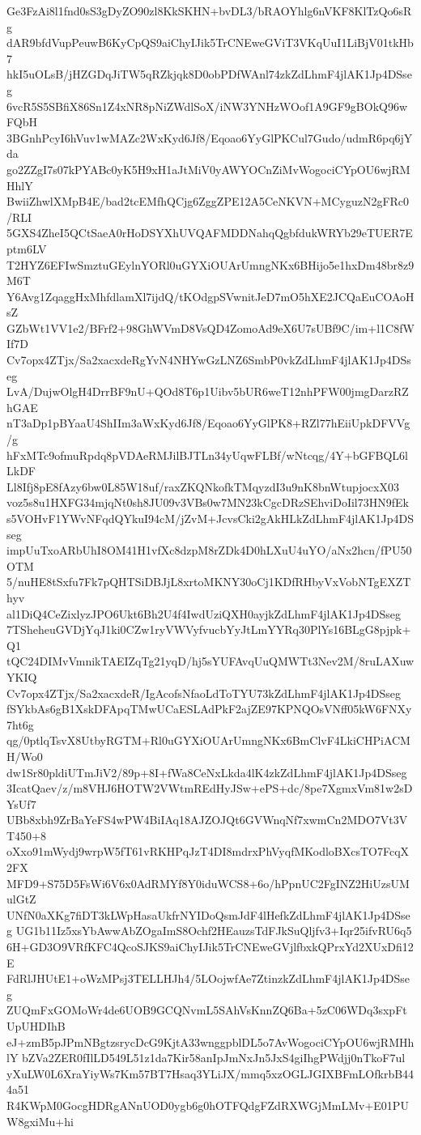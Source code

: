 Ge3FzAi8l1fnd0sS3gDyZO90zl8KkSKHN+bvDL3/bRAOYhlg6nVKF8KlTzQo6sRg
dAR9bfdVupPeuwB6KyCpQS9aiChyIJik5TrCNEweGViT3VKqUuI1LiBjV01tkHb7
hkI5uOLsB/jHZGDqJiTW5qRZkjqk8D0obPDfWAnl74zkZdLhmF4jlAK1Jp4DSseg
6vcR5S5SBfiX86Sn1Z4xNR8pNiZWdlSoX/iNW3YNHzWOof1A9GF9gBOkQ96wFQbH
3BGnhPcyI6hVuv1wMAZc2WxKyd6Jf8/Eqoao6YyGlPKCul7Gudo/udmR6pq6jYda
go2ZZgI7s07kPYABc0yK5H9xH1aJtMiV0yAWYOCnZiMvWogociCYpOU6wjRMHhlY
BwiiZhwlXMpB4E/bad2tcEMfhQCjg6ZggZPE12A5CeNKVN+MCyguzN2gFRc0/RLI
5GXS4ZheI5QCtSaeA0rHoDSYXhUVQAFMDDNahqQgbfdukWRYb29eTUER7Eptm6LV
T2HYZ6EFIwSmztuGEylnYORl0uGYXiOUArUmngNKx6BHijo5e1hxDm48br8z9M6T
Y6Avg1ZqaggHxMhfdlamXl7ijdQ/tKOdgpSVwnitJeD7mO5hXE2JCQaEuCOAoHsZ
GZbWt1VV1e2/BFrf2+98GhWVmD8VsQD4ZomoAd9eX6U7sUBf9C/im+l1C8fWIf7D
Cv7opx4ZTjx/Sa2xacxdeRgYvN4NHYwGzLNZ6SmbP0vkZdLhmF4jlAK1Jp4DSseg
LvA/DujwOlgH4DrrBF9nU+QOd8T6p1Uibv5bUR6weT12nhPFW00jmgDarzRZhGAE
nT3aDp1pBYaaU4ShIIm3aWxKyd6Jf8/Eqoao6YyGlPK8+RZl77hEiiUpkDFVVg/g
hFxMTc9ofmuRpdq8pVDAeRMJilBJTLn34yUqwFLBf/wNtcqg/4Y+bGFBQL6lLkDF
Ll8Ifj8pE8fAzy6bw0L85W18uf/raxZKQNkofkTMqyzdI3u9nK8bnWtupjocxX03
voz5s8u1HXFG34mjqNt0sh8JU09v3VBs0w7MN23kCgcDRzSEhviDoIil73HN9fEk
s5VOHvF1YWvNFqdQYkuI94cM/jZvM+JcvsCki2gAkHLkZdLhmF4jlAK1Jp4DSseg
impUuTxoARbUhI8OM41H1vfXc8dzpM8rZDk4D0hLXuU4uYO/aNx2hcn/fPU50OTM
5/nuHE8tSxfu7Fk7pQHTSiDBJjL8xrtoMKNY30oCj1KDfRHbyVxVobNTgEXZThyv
al1DiQ4CeZixlyzJPO6Ukt6Bh2U4f4IwdUziQXH0ayjkZdLhmF4jlAK1Jp4DSseg
7TSheheuGVDjYqJ1ki0CZw1ryVWVyfvucbYyJtLmYYRq30PlYs16BLgG8pjpk+Q1
tQC24DIMvVmnikTAEIZqTg21yqD/hj5sYUFAvqUuQMWTt3Nev2M/8ruLAXuwYKIQ
Cv7opx4ZTjx/Sa2xacxdeR/IgAcofsNfaoLdToTYU73kZdLhmF4jlAK1Jp4DSseg
fSYkbAs6gB1XskDFApqTMwUCaESLAdPkF2ajZE97KPNQOsVNff05kW6FNXy7ht6g
qg/0ptlqTsvX8UtbyRGTM+Rl0uGYXiOUArUmngNKx6BmClvF4LkiCHPiACMH/Wo0
dw1Sr80pldiUTmJiV2/89p+8I+fWa8CeNxLkda4lK4zkZdLhmF4jlAK1Jp4DSseg
3IcatQaev/z/m8VHJ6HOTW2VWtmREdHyJSw+ePS+dc/8pe7XgmxVm81w2sDYsUf7
UBb8xbh9ZrBaYeFS4wPW4BiIAq18AJZOJQt6GVWnqNf7xwmCn2MDO7Vt3VT450+8
oXxo91mWydj9wrpW5fT61vRKHPqJzT4DI8mdrxPhVyqfMKodloBXcsTO7FcqX2FX
MFD9+S75D5FsWi6V6x0AdRMYf8Y0iduWCS8+6o/hPpnUC2FgINZ2HiUzsUMulGtZ
UNfN0aXKg7fiDT3kLWpHasaUkfrNYIDoQsmJdF4lHefkZdLhmF4jlAK1Jp4DSseg
UG1b11Iz5xsYbAwwAbZOgaImS8Ochf2HEauzsTdFJkSuQljfv3+Iqr25ifvRU6q5
6H+GD3O9VRfKFC4QcoSJKS9aiChyIJik5TrCNEweGVjlfbxkQPrxYd2XUxDfi12E
FdRlJHUtE1+oWzMPsj3TELLHJh4/5LOojwfAe7ZtinzkZdLhmF4jlAK1Jp4DSseg
ZUQmFxGOMoWr4de6UOB9GCQNvmL5SAhVsKnnZQ6Ba+5zC06WDq3sxpFtUpUHDIhB
eJ+zmB5pJPmNBgtzsrycDcG9KjtA33wnggpblDL5o7AvWogociCYpOU6wjRMHhlY
bZVa2ZER0fIlLD549L51z1da7Kir58anIpJmNxJn5JxS4giIhgPWdjj0nTkoF7ul
yXuLW0L6XraYiyWs7Km57BT7Hsaq3YLiJX/mmq5xzOGLJGIXBFmLOfkrbB444a51
R4KWpM0GocgHDRgANnUOD0ygb6g0hOTFQdgFZdRXWGjMmLMv+E01PUW8gxiMu+hi
